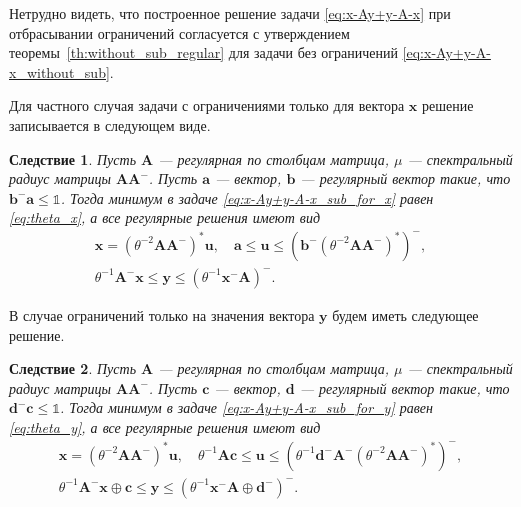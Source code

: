 \documentclass[specialist,
               substylefile = spbu.rtx,
               subf,href,colorlinks=true, 12pt]{disser}
\newtheorem{corollary}{Следствие}
\theoremstyle{definition}
\begin{document}
Нетрудно видеть, что построенное решение задачи \eqref{eq:x-Ay+y-A-x} при отбрасывании ограничений согласуется с утверждением теоремы~\ref{th:without_sub_regular} для задачи без ограничений \eqref{eq:x-Ay+y-A-x_without_sub}.

Для частного случая задачи с ограничениями только для вектора $\bm{x}$ решение записывается в следующем виде.
\begin{corollary}\label{cor:column-regular_sub_x}
Пусть $\bm{A}$ --- регулярная по столбцам матрица, $\mu$ --- спектральный радиус матрицы $\bm{A}\bm{A}^{-}$. Пусть $\bm{a}$ --- вектор, $\bm{b}$ --- регулярный вектор такие, что $\bm{b}^{-}\bm{a}\leq\mathbb{1}$.
Тогда минимум в задаче \eqref{eq:x-Ay+y-A-x_sub_for_x} равен \eqref{eq:theta_x}, а все регулярные решения имеют вид
\begin{equation*}
\begin{gathered}
\bm{x}=(\theta^{-2}\bm{A}\bm{A}^{-})^{\ast}\bm{u},
\quad
\bm{a}
\leq
\bm{u}
\leq
(\bm{b}^{-}(\theta^{-2}\bm{A}\bm{A}^{-})^{\ast})^{-},\\
\theta^{-1}\bm{A}^{-}\bm{x}
\leq
\bm{y}
\leq
(\theta^{-1}\bm{x}^{-}\bm{A})^{-}.
\end{gathered}
\end{equation*}
\end{corollary}

В случае ограничений только на значения вектора $\bm{y}$ будем иметь следующее решение.
\begin{corollary}\label{cor:column-regular_sub_y}
Пусть $\bm{A}$ --- регулярная по столбцам матрица, $\mu$ --- спектральный радиус матрицы $\bm{A}\bm{A}^{-}$. Пусть $\bm{c}$ --- вектор, $\bm{d}$ --- регулярный вектор такие, что $\bm{d}^{-}\bm{c}\leq\mathbb{1}$.
Тогда минимум в задаче \eqref{eq:x-Ay+y-A-x_sub_for_y} равен \eqref{eq:theta_y}, а все регулярные решения имеют вид
\begin{equation*}
\begin{gathered}
\bm{x}=(\theta^{-2}\bm{A}\bm{A}^{-})^{\ast}\bm{u},
\quad
\theta^{-1}\bm{A}\bm{c}
\leq
\bm{u}
\leq
(\theta^{-1}\bm{d}^{-}\bm{A}^{-}(\theta^{-2}\bm{A}\bm{A}^{-})^{\ast})^{-},\\
\theta^{-1}\bm{A}^{-}\bm{x}\oplus\bm{c}
\leq
\bm{y}
\leq
(\theta^{-1}\bm{x}^{-}\bm{A}\oplus\bm{d}^{-})^{-}.
\end{gathered}
\end{equation*}
\end{corollary}
\end{document}
